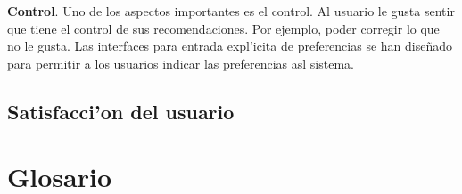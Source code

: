 \documentclass[11pt]{article}
\begin{document}
\textbf{Control}. Uno de los aspectos importantes es el control. Al usuario le gusta sentir que tiene el control de sus recomendaciones. Por ejemplo, poder corregir lo que no le gusta. Las interfaces para entrada expl'icita de preferencias se han dise\~{n}ado para permitir a los usuarios indicar las preferencias asl sistema.
\subsection{Satisfacci'on del usuario}


\newpage
\appendix
\section{Glosario}
\end{document}
